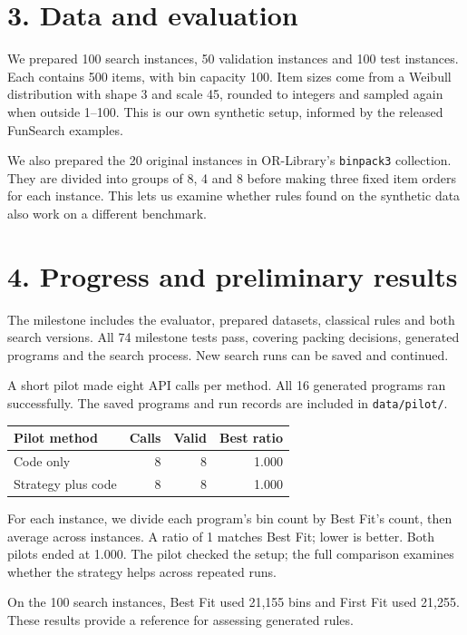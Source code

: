 \documentclass[12pt,a4paper]{article}
\begin{document}
\section*{3. Data and evaluation}
We prepared 100 search instances, 50 validation instances and 100 test instances. Each contains 500 items, with bin capacity 100. Item sizes come from a Weibull distribution with shape 3 and scale 45, rounded to integers and sampled again when outside 1--100. This is our own synthetic setup, informed by the released FunSearch examples.

We also prepared the 20 original instances in OR-Library's \texttt{binpack3} collection. They are divided into groups of 8, 4 and 8 before making three fixed item orders for each instance. This lets us examine whether rules found on the synthetic data also work on a different benchmark.

\newpage
\section*{4. Progress and preliminary results}
The milestone includes the evaluator, prepared datasets, classical rules and both search versions. All 74 milestone tests pass, covering packing decisions, generated programs and the search process. New search runs can be saved and continued.

A short pilot made eight API calls per method. All 16 generated programs ran successfully. The saved programs and run records are included in \texttt{data/pilot/}.

\begin{center}
\begin{tabularx}{\linewidth}{@{}Yrrr@{}}
\toprule
\textbf{Pilot method} & \textbf{Calls} & \textbf{Valid} & \textbf{Best ratio}\\
\midrule
Code only & 8 & 8 & 1.000\\
Strategy plus code & 8 & 8 & 1.000\\
\bottomrule
\end{tabularx}
\end{center}
\vspace{-2pt}
For each instance, we divide each program's bin count by Best Fit's count, then average across instances. A ratio of 1 matches Best Fit; lower is better. Both pilots ended at 1.000. The pilot checked the setup; the full comparison examines whether the strategy helps across repeated runs.

On the 100 search instances, Best Fit used 21,155 bins and First Fit used 21,255. These results provide a reference for assessing generated rules.
\end{document}
